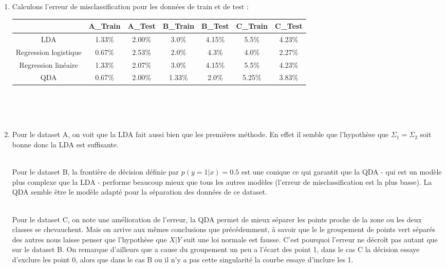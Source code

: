 \documentclass{article}
\begin{document}
\begin{enumerate}
\begin{enumerate}
\\
\\
\item
Calculons l'erreur de misclassification pour les données de train et de test :
\begin{center}
\begin{tabular}{||c c c c c c c||} 
 \hline
 & A_Train & A_Test & B_Train & B_Test & C_Train& C_Test\\ 
 [0.5ex] 
 \hline\hline
 LDA & 1.33\% & 2.00\% & 3.0\% & 4.15\% & 5.5\% & 4.23\% \\
 \hline
 Regression logistique & 0.67\% & 2.53\% & 2.0\% & 4.3\% & 4.0\% & 2.27\% \\
 \hline
 Regression linéaire & 1.33\% & 2.07\% & 3.0\% & 4.15\% & 5.5\% & 4.23\% \\
 \hline
 QDA & 0.67\% & 2.00\% & 1.33\% & 2.0\% & 5.25\% & 3.83\% \\
 \hline
\end{tabular}
\end{center}

\\
\\
\\
\item

Pour le dataset A, on voit que la LDA fait aussi bien que les premières méthode. En effet il semble que l'hypothèse que $\Sigma_1 = \Sigma_2$ soit bonne donc la LDA est suffisante.

\\Pour le dataset B, la frontière de décision définie par $p(y=1|x)=0.5$ est une conique ce qui garantit que la QDA - qui est un modèle plus complexe que la LDA - performe beaucoup mieux que tous les autres modèles (l'erreur de misclassification est la plus basse). La QDA semble être le modèle adapté pour la séparation des données de ce dataset.


\\Pour le dataset C, on note une amélioration de l'erreur, la QDA permet de mieux séparer les points proche de la zone ou les deux classes se chevauchent. Mais on arrive aux mêmes conclusions que précédemment, à savoir que le le groupement de points vert séparés des autres nous laisse penser que l'hypothèse que $X|Y$ suit une loi normale est fausse. C'est pourquoi l'erreur ne décroît pas autant que sur le dataset B. On remarque d'ailleurs que a cause du groupement un peu a l'écart des point 1, dans le cas C la décision essaye d'exclure les point 0, alors que dans le cas B ou il n'y a pas cette singularité la courbe essaye d'inclure les 1.

\end{enumerate}
\end{enumerate}
\end{document}
